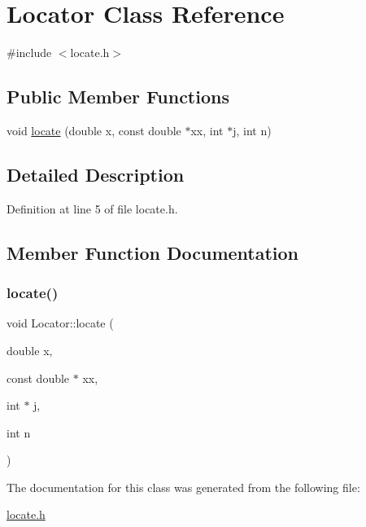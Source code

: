 \hypertarget{classLocator}{}\section{Locator Class Reference}
\label{classLocator}


{\ttfamily \#include $<$locate.\+h$>$}

\subsection*{Public Member Functions}
\begin{DoxyCompactItemize}
\item 
void \hyperlink{classLocator_a013907149b471a57706b358a478a4374}{locate} (double x, const double $\ast$xx, int $\ast$j, int n)
\end{DoxyCompactItemize}


\subsection{Detailed Description}


Definition at line 5 of file locate.\+h.



\subsection{Member Function Documentation}
\mbox{\label{classLocator_a013907149b471a57706b358a478a4374}} 
\subsubsection{\texorpdfstring{locate()}{locate()}}
{\footnotesize\ttfamily void Locator\+::locate (\begin{DoxyParamCaption}\item[{double}]{x,  }\item[{const double $\ast$}]{xx,  }\item[{int $\ast$}]{j,  }\item[{int}]{n }\end{DoxyParamCaption})}



The documentation for this class was generated from the following file\+:\begin{DoxyCompactItemize}
\item 
\hyperlink{locate_8h}{locate.\+h}\end{DoxyCompactItemize}
